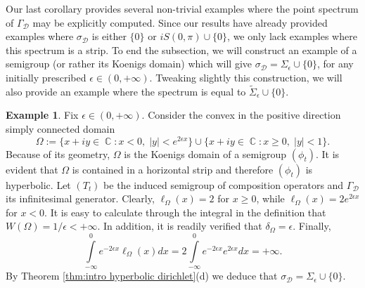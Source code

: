 \documentclass[11pt]{amsart}
\numberwithin{equation}{section}
\theoremstyle{definition}
\newtheorem{example}[theorem]{Example}
\DeclareMathOperator{\C}{\mathbb{C}}
\begin{document}
	
	Our last corollary provides several non-trivial examples where the point spectrum of $\Gamma_\mathcal{D}$ may be explicitly computed. Since our results have already provided examples where $\sigma_{\mathcal{D}}$ is either $\{0\}$ or $iS(0,\pi)\cup\{0\}$, we only lack examples where this spectrum is a strip. To end the subsection, we will construct an example of a semigroup (or rather its Koenigs domain) which will give $\sigma_{\mathcal{D}}=\Sigma_{\epsilon}\cup\{0\}$, for any initially prescribed $\epsilon\in(0,+\infty)$. Tweaking slightly this construction, we will also provide an example where the spectrum is equal to $\widetilde{\Sigma}_\epsilon\cup\{0\}$.
	
	\begin{example}
		Fix $\epsilon\in(0,+\infty)$. Consider the convex in the positive direction simply connected domain 
		$$\Omega:=\{x+iy\in\C:x<0,\; |y|<e^{2\epsilon x}\}\cup\{x+iy\in\C:x\ge0,\; |y|<1\}.$$
		Because of its geometry, $\Omega$ is the Koenigs domain of a semigroup $(\phi_t)$. It is evident that $\Omega$ is contained in a horizontal strip and therefore $(\phi_t)$ is hyperbolic. Let $(T_t)$ be the induced semigroup of composition operators and $\Gamma_\mathcal{D}$ its infinitesimal generator. Clearly, $\ell_\Omega(x)=2$ for $x\ge0$, while $\ell_\Omega(x)=2e^{2\epsilon x}$ for $x<0$. It is easy to calculate through the integral in the definition that $W(\Omega)=1/\epsilon<+\infty$. In addition, it is readily verified that $\delta_\Omega=\epsilon$. Finally, 
		$$\int\limits_{-\infty}^{0}e^{-2\epsilon x}\ell_\Omega(x)dx=2\int\limits_{-\infty}^{0}e^{-2\epsilon x}e^{2\epsilon x}dx=+\infty.$$ 
		By Theorem \ref{thm:intro hyperbolic dirichlet}(d) we deduce that $\sigma_{\mathcal{D}}=\Sigma_\epsilon\cup\{0\}$.
	\end{example}
	
\end{document}
